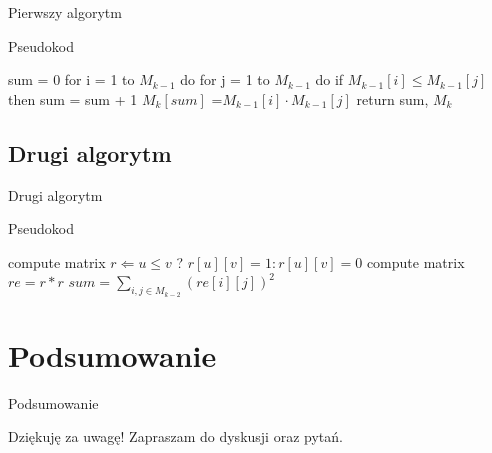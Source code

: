 \documentclass{if-beamer}
\begin{document}
\begin{frame}{Pierwszy algorytm}
\begin{block}{Pseudokod}
\begin{large}
sum = 0 \linebreak
for i = 1 to $M_{k-1}$ do \linebreak
{}
for j = 1 to $M_{k-1}$ do \linebreak
{}
if $M_{k-1}[i] \leqslant M_{k-1}[j]$ then \linebreak
{}
sum = sum + 1 \linebreak\linebreak
{}
$M_{k}[sum]$ =$M_{k-1}[i] \cdot M_{k-1}[j]$ \linebreak
return sum, $M_{k}$
\end{large}
\end{block}
\end{frame}

\subsection{Drugi algorytm}

\begin{frame}{Drugi algorytm}
\begin{block}{Pseudokod}
\begin{large}
compute matrix $ r \Leftarrow u \leqslant v$ ? $r[u][v] = 1 : r[u][v] = 0 $\linebreak\linebreak
compute matrix $ re = r * r $ \linebreak\linebreak
$ sum = \sum_{i, j \in M_{k - 2}}(re[i][j])^{2}$
\end{large}
\end{block}
\end{frame}

\section{Podsumowanie}
\begin{frame}{Podsumowanie}

\centering
\begin{Large}
Dziękuję za uwagę! \linebreak Zapraszam do dyskusji oraz pytań.
\end{Large}
\end{frame}

\end{document}
